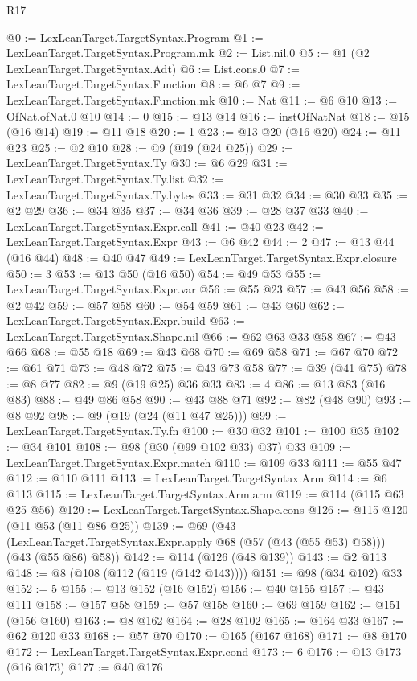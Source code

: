 \begin{lexlean}{R17}
\begin{coremodule}
@0 := LexLeanTarget.TargetSyntax.Program
@1 := LexLeanTarget.TargetSyntax.Program.mk
@2 := List.nil.{0}
@5 := @1 (@2 LexLeanTarget.TargetSyntax.Adt)
@6 := List.cons.{0}
@7 := LexLeanTarget.TargetSyntax.Function
@8 := @6 @7
@9 := LexLeanTarget.TargetSyntax.Function.mk
@10 := Nat
@11 := @6 @10
@13 := OfNat.ofNat.{0} @10
@14 := 0
@15 := @13 @14
@16 := instOfNatNat
@18 := @15 (@16 @14)
@19 := @11 @18
@20 := 1
@23 := @13 @20 (@16 @20)
@24 := @11 @23
@25 := @2 @10
@28 := @9 (@19 (@24 @25))
@29 := LexLeanTarget.TargetSyntax.Ty
@30 := @6 @29
@31 := LexLeanTarget.TargetSyntax.Ty.list
@32 := LexLeanTarget.TargetSyntax.Ty.bytes
@33 := @31 @32
@34 := @30 @33
@35 := @2 @29
@36 := @34 @35
@37 := @34 @36
@39 := @28 @37 @33
@40 := LexLeanTarget.TargetSyntax.Expr.call
@41 := @40 @23
@42 := LexLeanTarget.TargetSyntax.Expr
@43 := @6 @42
@44 := 2
@47 := @13 @44 (@16 @44)
@48 := @40 @47
@49 := LexLeanTarget.TargetSyntax.Expr.closure
@50 := 3
@53 := @13 @50 (@16 @50)
@54 := @49 @53
@55 := LexLeanTarget.TargetSyntax.Expr.var
@56 := @55 @23
@57 := @43 @56
@58 := @2 @42
@59 := @57 @58
@60 := @54 @59
@61 := @43 @60
@62 := LexLeanTarget.TargetSyntax.Expr.build
@63 := LexLeanTarget.TargetSyntax.Shape.nil
@66 := @62 @63 @33 @58
@67 := @43 @66
@68 := @55 @18
@69 := @43 @68
@70 := @69 @58
@71 := @67 @70
@72 := @61 @71
@73 := @48 @72
@75 := @43 @73 @58
@77 := @39 (@41 @75)
@78 := @8 @77
@82 := @9 (@19 @25) @36 @33
@83 := 4
@86 := @13 @83 (@16 @83)
@88 := @49 @86 @58
@90 := @43 @88 @71
@92 := @82 (@48 @90)
@93 := @8 @92
@98 := @9 (@19 (@24 (@11 @47 @25)))
@99 := LexLeanTarget.TargetSyntax.Ty.fn
@100 := @30 @32
@101 := @100 @35
@102 := @34 @101
@108 := @98 (@30 (@99 @102 @33) @37) @33
@109 := LexLeanTarget.TargetSyntax.Expr.match
@110 := @109 @33
@111 := @55 @47
@112 := @110 @111
@113 := LexLeanTarget.TargetSyntax.Arm
@114 := @6 @113
@115 := LexLeanTarget.TargetSyntax.Arm.arm
@119 := @114 (@115 @63 @25 @56)
@120 := LexLeanTarget.TargetSyntax.Shape.cons
@126 := @115 @120 (@11 @53 (@11 @86 @25))
@139 := @69
    (@43 (LexLeanTarget.TargetSyntax.Expr.apply @68 (@57 (@43 (@55 @53) @58))) (@43 (@55 @86) @58))
@142 := @114 (@126 (@48 @139))
@143 := @2 @113
@148 := @8 (@108 (@112 (@119 (@142 @143))))
@151 := @98 (@34 @102) @33
@152 := 5
@155 := @13 @152 (@16 @152)
@156 := @40 @155
@157 := @43 @111
@158 := @157 @58
@159 := @57 @158
@160 := @69 @159
@162 := @151 (@156 @160)
@163 := @8 @162
@164 := @28 @102
@165 := @164 @33
@167 := @62 @120 @33
@168 := @57 @70
@170 := @165 (@167 @168)
@171 := @8 @170
@172 := LexLeanTarget.TargetSyntax.Expr.cond
@173 := 6
@176 := @13 @173 (@16 @173)
@177 := @40 @176

\end{coremodule}
\end{lexlean}
